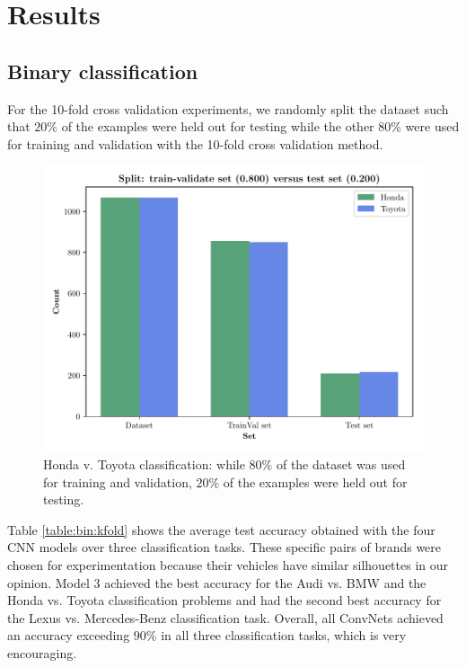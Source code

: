 \documentclass[conference]{IEEEtran}
\begin{document}
\section{Results} \label{section:results}
\subsection{Binary classification}
For the 10-fold cross validation experiments, we randomly split the dataset such that $20\%$ of the examples were held out for testing while the other $80\%$ were used for training and validation with the 10-fold cross validation method. 

\begin{figure}[ht]
    \centering
    \includegraphics[scale=0.48]{main_03_binary_classification_00_Honda_Toyota_split.pdf}
    \caption{Honda v. Toyota classification: while $80\%$ of the dataset was used for training and validation, $20\%$ of the examples were held out for testing.}
    \label{fig:hondatoyo}
\end{figure}

Table \ref{table:bin:kfold} shows the average test accuracy obtained with the four CNN models over three classification tasks. These specific pairs of brands were chosen for experimentation because their vehicles have similar silhouettes in our opinion. Model 3 achieved the best accuracy for the Audi vs. BMW and the Honda vs. Toyota classification problems and had the second best accuracy for the Lexus vs. Mercedes-Benz classification task. Overall, all ConvNets achieved an accuracy exceeding $90\%$ in all three classification tasks, which is very encouraging.
\end{document}
